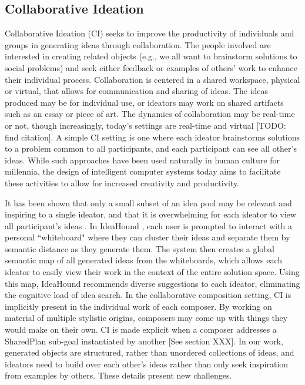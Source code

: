 \documentclass[final,authoryear,5p,times,twocolumn]{elsarticle}
\begin{document}
\subsection{Collaborative Ideation}
Collaborative Ideation (CI) seeks to improve the productivity of individuals and groups in generating ideas through collaboration. The people involved are interested in creating related objects (e.g., we all want to brainstorm solutions to social problems) and seek either feedback or examples of others' work to enhance their individual process. Collaboration is centered in a shared workspace, physical or virtual, that allows for communication and sharing of ideas. The ideas produced may be for individual use, or ideators may work on shared artifacts such as an essay or piece of art. The dynamics of collaboration may be real-time or not, though increasingly, today's settings are real-time and virtual [TODO: find citation]. A simple CI setting is one where each ideator brainstorms solutions to a problem common to all participants, and each participant can see all other's ideas. While such approaches have been used naturally in human culture for millennia, the design of intelligent computer systems today aims to facilitate these activities to allow for increased creativity and productivity. 

It has been shown that only a small subset of an idea pool may be relevant and inspiring to a single ideator, and that it is overwhelming for each ideator to view all participant's ideas \citep{siangliulue2015toward}. In IdeaHound \citep{siangliulue2016ideahound}, each user is prompted to interact with a personal ``whiteboard" where they can cluster their ideas and separate them by semantic distance as they generate them. The system then creates a global semantic map of all generated ideas from the whiteboards, which allows each ideator to easily view their work in the context of the entire solution space. Using this map, IdeaHound recommends diverse suggestions to each ideator, eliminating the cognitive load of idea search. In the collaborative composition setting, CI is implicitly present in the individual work of each composer. By working on material of multiple stylistic origins, composers may come up with things they would make on their own. CI is made explicit when a composer addresses a SharedPlan sub-goal instantiated by another [See section XXX]. In our work, generated objects are structured, rather than unordered collections of ideas, and ideators need to build over each other's ideas rather than only seek inspiration from examples by others. These details present new challenges.
\end{document}

